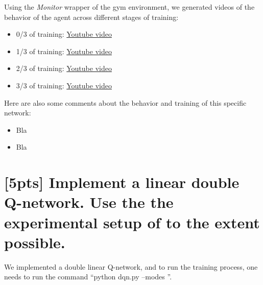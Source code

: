 \documentclass{article}
\begin{document}

Using the \textit{Monitor} wrapper of the gym environment, we generated videos of the behavior of the agent across different stages of training:

\begin{itemize}
  \item 0/3 of training: \href{http://www.sharelatex.com}{Youtube video}
  \item 1/3 of training: \href{http://www.sharelatex.com}{Youtube video}
  \item 2/3 of training: \href{http://www.sharelatex.com}{Youtube video}
  \item 3/3 of training: \href{http://www.sharelatex.com}{Youtube video}
\end{itemize}

Here are also some comments about the behavior and training of this specific network:

\begin{itemize}
  \item Bla
  \item Bla
\end{itemize}

\section{[5pts] Implement a linear double Q-network. Use the the experimental setup of \cite{mnih2013playing,mnih2015human} to the extent possible.}

We implemented a double linear Q-network, and to run the training process, one needs to run the command ``python dqn.py --modes ''.
\end{document}
